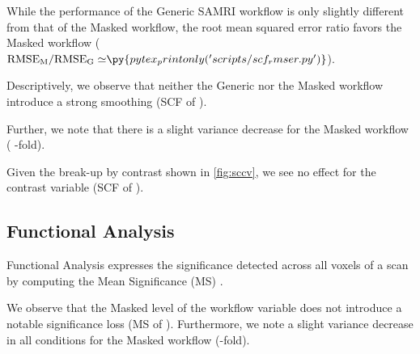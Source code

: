 While the performance of the Generic SAMRI workflow is only slightly different from that of the Masked workflow, the root mean squared error ratio favors the Masked workflow ($\mathrm{RMSE_{M}/RMSE_{G}\simeq} \py{pytex_printonly('scripts/scf_rmser.py')}$).

Descriptively, we observe that neither the Generic nor the Masked workflow introduce a strong smoothing (SCF of ).

Further, we note that there is a slight variance decrease for the Masked workflow
(
-fold).

Given the break-up by contrast shown in \cref{fig:sccv}, we see no effect for the contrast variable
(SCF of ).

\subsection{Functional Analysis}

Functional Analysis expresses the significance detected across all voxels of a scan by computing the Mean Significance (MS) \cite{ioanas_optimized_2019}.

We observe that the Masked level of the workflow variable does not introduce a notable significance loss
(MS of ).
Furthermore, we note a slight variance decrease in all conditions for the Masked workflow
(-fold).

